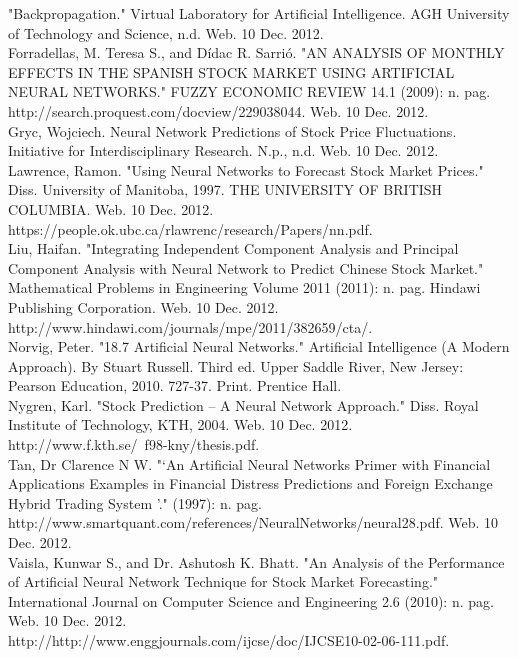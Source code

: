 \documentclass[a4paper,11pt]{article}
\begin{document}
"Backpropagation." Virtual Laboratory for Artificial Intelligence. AGH University of Technology and Science, n.d. Web. 10 Dec. 2012.\\


Forradellas, M. Teresa S., and Dídac R. Sarrió. "AN ANALYSIS OF MONTHLY EFFECTS IN THE SPANISH STOCK MARKET USING ARTIFICIAL NEURAL NETWORKS." FUZZY ECONOMIC REVIEW 14.1 (2009): n. pag.\\ http://search.proquest.com/docview/229038044. Web. 10 Dec. 2012.\\

Gryc, Wojciech. Neural Network Predictions of Stock Price Fluctuations. Initiative for Interdisciplinary Research. N.p., n.d. Web. 10 Dec. 2012.\\

Lawrence, Ramon. "Using Neural Networks to Forecast Stock Market Prices." Diss. University of Manitoba, 1997. THE UNIVERSITY OF BRITISH COLUMBIA. Web. 10 Dec. 2012. https://people.ok.ubc.ca/rlawrenc/research/Papers/nn.pdf.\\

Liu, Haifan. "Integrating Independent Component Analysis and Principal Component Analysis with Neural Network to Predict Chinese Stock Market." Mathematical Problems in Engineering Volume 2011 (2011): n. pag. Hindawi Publishing Corporation. Web. 10 Dec. 2012.\\ http://www.hindawi.com/journals/mpe/2011/382659/cta/.\\

Norvig, Peter. "18.7 Artificial Neural Networks." Artificial Intelligence (A Modern Approach). By Stuart Russell. Third ed. Upper Saddle River, New Jersey: Pearson Education, 2010. 727-37. Print. Prentice Hall.\\

Nygren, Karl. "Stock Prediction – A Neural Network Approach." Diss. Royal Institute of Technology, KTH, 2004. Web. 10 Dec. 2012. http://www.f.kth.se/~f98-kny/thesis.pdf.\\

Tan, Dr Clarence N W. "‘An Artificial Neural Networks Primer with Financial Applications Examples in Financial Distress Predictions and Foreign Exchange Hybrid Trading System ’." (1997): n. pag.\\ http://www.smartquant.com/references/NeuralNetworks/neural28.pdf. Web. 10 Dec. 2012. \\

Vaisla, Kunwar S., and Dr. Ashutosh K. Bhatt. "An Analysis of the Performance of Artificial Neural Network Technique for Stock Market Forecasting." International Journal on Computer Science and Engineering 2.6 (2010): n. pag. Web. 10 Dec. 2012.\\ http://http://www.enggjournals.com/ijcse/doc/IJCSE10-02-06-111.pdf.\\
\newline
\end{document}
